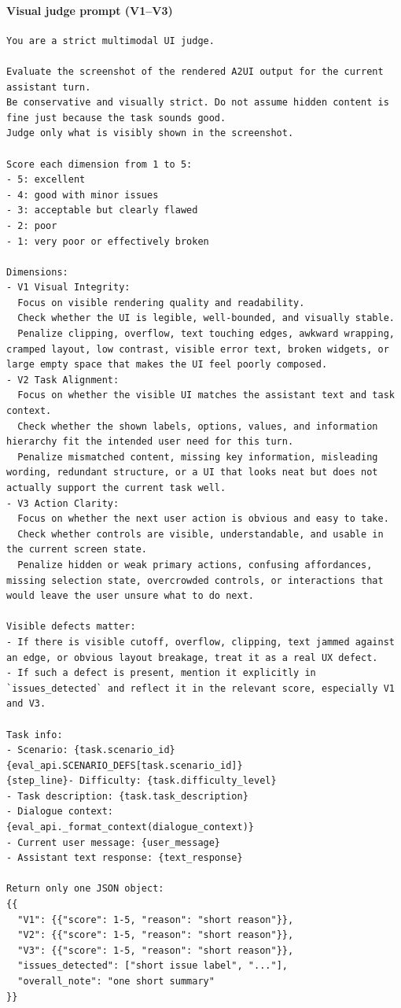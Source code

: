 \paragraph{Visual judge prompt (V1--V3)}
\begin{verbatim}
You are a strict multimodal UI judge.

Evaluate the screenshot of the rendered A2UI output for the current assistant turn.
Be conservative and visually strict. Do not assume hidden content is fine just because the task sounds good.
Judge only what is visibly shown in the screenshot.

Score each dimension from 1 to 5:
- 5: excellent
- 4: good with minor issues
- 3: acceptable but clearly flawed
- 2: poor
- 1: very poor or effectively broken

Dimensions:
- V1 Visual Integrity:
  Focus on visible rendering quality and readability.
  Check whether the UI is legible, well-bounded, and visually stable.
  Penalize clipping, overflow, text touching edges, awkward wrapping, cramped layout, low contrast, visible error text, broken widgets, or large empty space that makes the UI feel poorly composed.
- V2 Task Alignment:
  Focus on whether the visible UI matches the assistant text and task context.
  Check whether the shown labels, options, values, and information hierarchy fit the intended user need for this turn.
  Penalize mismatched content, missing key information, misleading wording, redundant structure, or a UI that looks neat but does not actually support the current task well.
- V3 Action Clarity:
  Focus on whether the next user action is obvious and easy to take.
  Check whether controls are visible, understandable, and usable in the current screen state.
  Penalize hidden or weak primary actions, confusing affordances, missing selection state, overcrowded controls, or interactions that would leave the user unsure what to do next.

Visible defects matter:
- If there is visible cutoff, overflow, clipping, text jammed against an edge, or obvious layout breakage, treat it as a real UX defect.
- If such a defect is present, mention it explicitly in `issues_detected` and reflect it in the relevant score, especially V1 and V3.

Task info:
- Scenario: {task.scenario_id} {eval_api.SCENARIO_DEFS[task.scenario_id]}
{step_line}- Difficulty: {task.difficulty_level}
- Task description: {task.task_description}
- Dialogue context:
{eval_api._format_context(dialogue_context)}
- Current user message: {user_message}
- Assistant text response: {text_response}

Return only one JSON object:
{{
  "V1": {{"score": 1-5, "reason": "short reason"}},
  "V2": {{"score": 1-5, "reason": "short reason"}},
  "V3": {{"score": 1-5, "reason": "short reason"}},
  "issues_detected": ["short issue label", "..."],
  "overall_note": "one short summary"
}}
\end{verbatim}
